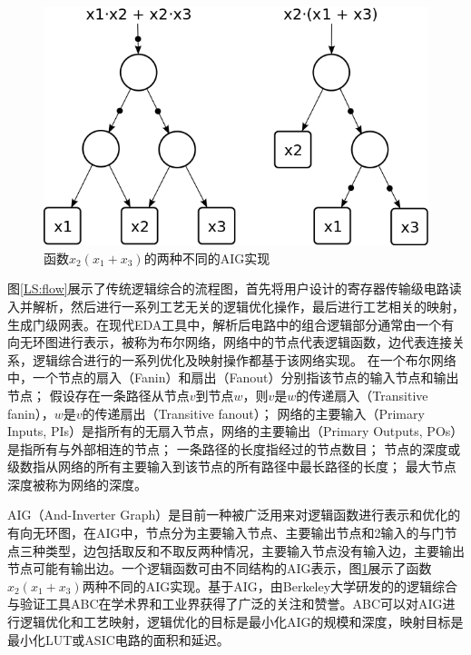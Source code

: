 \begin{figure}[!htbp]
    \centering
    \includegraphics[width=0.6\linewidth]{./figs/LS-two_AIG.png}
    \caption{函数$x_2 (x_1 + x_3)$的两种不同的AIG实现}
    \label{LS:two_AIG}
\end{figure}


图\ref{LS:flow}展示了传统逻辑综合的流程图，首先将用户设计的寄存器传输级电路读入并解析，然后进行一系列工艺无关的逻辑优化操作，最后进行工艺相关的映射，生成门级网表。在现代EDA工具中，解析后电路中的组合逻辑部分通常由一个有向无环图进行表示，被称为布尔网络\cite{FPGA:CLB_Anderson}，网络中的节点代表逻辑函数，边代表连接关系，逻辑综合进行的一系列优化及映射操作都基于该网络实现。
在一个布尔网络中\cite{LS:exact_rewriting,FPGA:Jason_Cong_1993,LS:Verification_after_synthesis}，一个节点的扇入（Fanin）和扇出（Fanout）分别指该节点的输入节点和输出节点；
假设存在一条路径从节点$v$到节点$w$，则$v$是$w$的传递扇入（Transitive fanin），$w$是$v$的传递扇出（Transitive fanout）；
网络的主要输入（Primary Inputs, PIs）是指所有的无扇入节点，网络的主要输出（Primary Outputs, POs）是指所有与外部相连的节点；
一条路径的长度指经过的节点数目；
节点的深度或级数指从网络的所有主要输入到该节点的所有路径中最长路径的长度；
最大节点深度被称为网络的深度。



AIG（And-Inverter Graph）是目前一种被广泛用来对逻辑函数进行表示和优化的有向无环图\cite{LS:AIG}，在AIG中，节点分为主要输入节点、主要输出节点和2输入的与门节点三种类型，边包括取反和不取反两种情况，主要输入节点没有输入边，主要输出节点可能有输出边。一个逻辑函数可由不同结构的AIG表示，图\ref{LS:two_AIG}展示了函数$x_2 (x_1 + x_3)$两种不同的AIG实现。基于AIG，由Berkeley大学研发的的逻辑综合与验证工具ABC\cite{LS:ABC}在学术界和工业界获得了广泛的关注和赞誉。ABC可以对AIG进行逻辑优化和工艺映射，逻辑优化的目标是最小化AIG的规模和深度，映射目标是最小化LUT或ASIC电路的面积和延迟。


